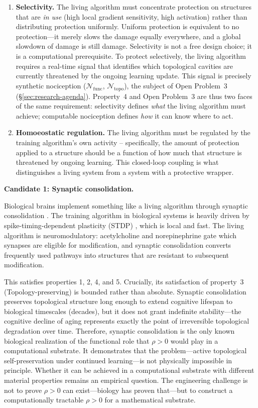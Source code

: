 \documentclass{article}
\begin{document}
\begin{enumerate}
    \item \textbf{Selectivity.} The living algorithm must concentrate protection on structures that are \emph{in use} (high local gradient sensitivity, high activation) rather than distributing protection uniformly. Uniform protection is equivalent to no protection---it merely slows the damage equally everywhere, and a global slowdown of damage is still damage. Selectivity is not a free design choice; it is a computational prerequisite. To protect selectively, the living algorithm requires a real-time signal that identifies which topological cavities are currently threatened by the ongoing learning update. This signal is precisely synthetic nociception ($\mathcal{N}_{\text{func}}$, $\mathcal{N}_{\text{topo}}$), the subject of Open Problem~3 (\S\ref{sec:research-agenda}). Property~4 and Open Problem~3 are thus two faces of the same requirement: selectivity defines \emph{what} the living algorithm must achieve; computable nociception defines \emph{how} it can know where to act.
    \item \textbf{Homoeostatic regulation.} The living algorithm must be regulated by the training algorithm's own activity -- specifically, the amount of protection applied to a structure should be a function of how much that structure is threatened by ongoing learning. This closed-loop coupling is what distinguishes a living system from a system with a protective wrapper.
\end{enumerate}

\medskip
\noindent\textbf{Candidate 1: Synaptic consolidation.}

Biological brains implement something like a living algorithm through synaptic consolidation \citep{Zenke2017temporal}. The training algorithm in biological systems is heavily driven by spike-timing-dependent plasticity (STDP) \citep{Bi1998stdp}, which is local and fast. The living algorithm is neuromodulatory: acetylcholine and norepinephrine gate which synapses are eligible for modification, and synaptic consolidation converts frequently used pathways into structures that are resistant to subsequent modification.

This satisfies properties 1, 2, 4, and 5. Crucially, its satisfaction of property~3 (Topology-preserving) is bounded rather than absolute. Synaptic consolidation preserves topological structure long enough to extend cognitive lifespan to biological timescales (decades), but it does not grant indefinite stability---the cognitive decline of aging represents exactly the point of irreversible topological degradation over time. Therefore, synaptic consolidation is the only known biological realization of the functional role that $\rho > 0$ would play in a computational substrate. It demonstrates that the problem---active topological self-preservation under continued learning---is not physically impossible in principle. Whether it can be achieved in a computational substrate with different material properties remains an empirical question. The engineering challenge is not to prove $\rho > 0$ can exist---biology has proven that---but to construct a computationally tractable $\rho > 0$ for a mathematical substrate.
\end{document}
